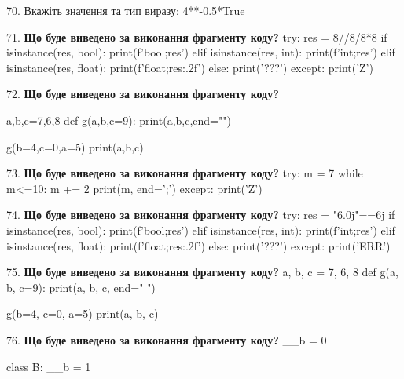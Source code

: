 \documentclass[11pt]{article}
\begin{document}
\par\vspace{5mm}

70. 
Вкажіть значення та тип виразу:
4**-0.5*True
\par\vspace{5mm}

71. \textbf{Що буде виведено за виконання фрагменту коду?}
try:
    res = 8//8/8*8
    if isinstance(res, bool):
        print(f'bool;{res}')
    elif isinstance(res, int):
        print(f'int;{res}')
    elif isinstance(res, float):
        print(f'float;{res:.2f}')
    else:
        print('???')
except:
    print('Z')
\par\vspace{5mm}

72. \textbf{Що буде виведено за виконання фрагменту коду?}

a,b,c=7,6,8
def g(a,b,c=9):
    print(a,b,c,end="")

g(b=4,c=0,a=5)
print(a,b,c)

\par\vspace{5mm}

73. \textbf{Що буде виведено за виконання фрагменту коду?}
try:
    m = 7
    while m<=10:
        m += 2
    print(m, end=';')
except:
    print('Z')
\par\vspace{5mm}

74. \textbf{Що буде виведено за виконання фрагменту коду?}
try:
    res = "6.0j"==6j
    if isinstance(res, bool):
        print(f'bool;{res}')
    elif isinstance(res, int):
        print(f'int;{res}')
    elif isinstance(res, float):
        print(f'float;{res:.2f}')
    else:
        print('???')
except:
    print('ERR')
\par\vspace{5mm}

75. \textbf{Що буде виведено за виконання фрагменту коду?}
a, b, c = 7, 6, 8
def g(a, b, c=9):
    print(a, b, c, end=" ")

g(b=4, c=0, a=5)
print(a, b, c)
\par\vspace{5mm}

76. \textbf{Що буде виведено за виконання фрагменту коду?}
__b = 0

class B:
    __b = 1
    
\end{document}
